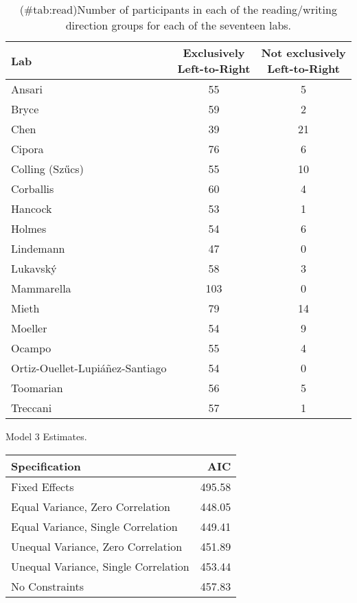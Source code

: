 \begin{appendix}
\begin{table}

\caption{(\#tab:read)Number of participants in each of the reading/writing direction groups for each of the seventeen labs.}
\centering
\begin{tabular}[t]{lcc}
\toprule
Lab & \makecell[c]{Exclusively\\Left-to-Right} & \makecell[c]{Not exclusively\\Left-to-Right}\\
\midrule
Ansari & 55 & 5\\
Bryce & 59 & 2\\
Chen & 39 & 21\\
Cipora & 76 & 6\\
Colling (Szűcs) & 55 & 10\\
Corballis & 60 & 4\\
Hancock & 53 & 1\\
Holmes & 54 & 6\\
Lindemann & 47 & 0\\
Lukavský & 58 & 3\\
Mammarella & 103 & 0\\
Mieth & 79 & 14\\
Moeller & 54 & 9\\
Ocampo & 55 & 4\\
Ortiz-Ouellet-Lupiáñez-Santiago & 54 & 0\\
Toomarian & 56 & 5\\
Treccani & 57 & 1\\
\bottomrule
\end{tabular}
\end{table}

\begin{table}[!p]
\caption{\label{tab:mod3}Model 3 Estimates.}
\begin{subtable}{\textwidth}
\centering
\begin{table}[H]\centering\begingroup\fontsize{10}{12}\selectfont

\begin{tabular}{lr}
\toprule
Specification & AIC\\
\midrule
Fixed Effects & 495.58\\
Equal Variance, Zero Correlation & 448.05\\
Equal Variance, Single Correlation & 449.41\\
Unequal Variance, Zero Correlation & 451.89\\
Unequal Variance, Single Correlation & 453.44\\
No Constraints & 457.83\\
\bottomrule
\end{tabular}\endgroup{}
\end{table}
\end{subtable}
\begin{subtable}{\textwidth}
\caption{Fixed Effect Estimates}
\centering
\begin{table}[H]\centering\begingroup\fontsize{10}{12}\selectfont


\end{table}
\end{subtable}
\end{table}
\end{appendix}
